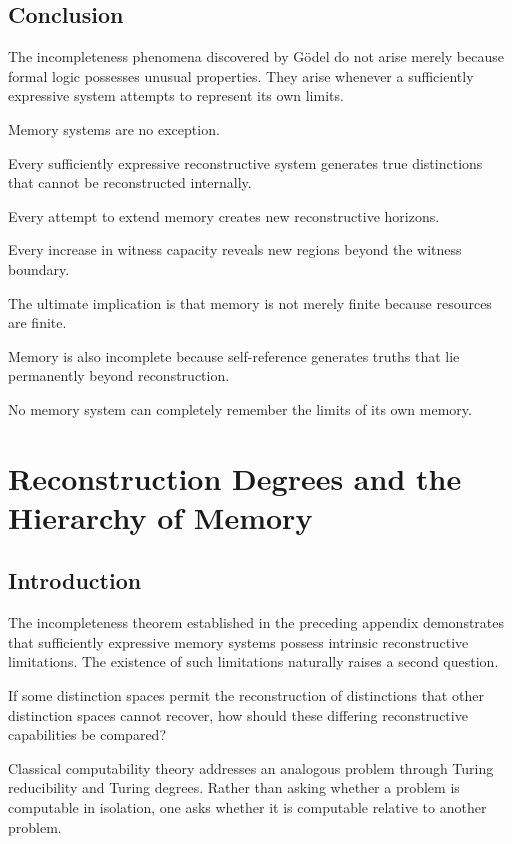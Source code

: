 \documentclass[12pt,oneside]{book}
\theoremstyle{plain} \newtheorem{theorem}{Theorem}[chapter] \newtheorem{lemma}[theorem]{Lemma} \newtheorem{proposition}[theorem]{Proposition} \newtheorem{corollary}[theorem]{Corollary}
\theoremstyle{definition} \newtheorem{definition}[theorem]{Definition} \newtheorem{axiom}[theorem]{Axiom} \newtheorem{construction}[theorem]{Construction}
\theoremstyle{remark} \newtheorem{remark}[theorem]{Remark} \newtheorem{example}[theorem]{Example}
\begin{document}
\section{Conclusion}

The incompleteness phenomena discovered by Gödel do not arise merely because formal logic possesses unusual properties. They arise whenever a sufficiently expressive system attempts to represent its own limits.

Memory systems are no exception.

Every sufficiently expressive reconstructive system generates true distinctions that cannot be reconstructed internally.

Every attempt to extend memory creates new reconstructive horizons.

Every increase in witness capacity reveals new regions beyond the witness boundary.

The ultimate implication is that memory is not merely finite because resources are finite.

Memory is also incomplete because self-reference generates truths that lie permanently beyond reconstruction.

No memory system can completely remember the limits of its own memory.

\chapter{Reconstruction Degrees and the Hierarchy of Memory}

\section{Introduction}

The incompleteness theorem established in the preceding appendix demonstrates that sufficiently expressive memory systems possess intrinsic reconstructive limitations. The existence of such limitations naturally raises a second question.

If some distinction spaces permit the reconstruction of distinctions that other distinction spaces cannot recover, how should these differing reconstructive capabilities be compared?

Classical computability theory addresses an analogous problem through Turing reducibility and Turing degrees. Rather than asking whether a problem is computable in isolation, one asks whether it is computable relative to another problem.
\end{document}
